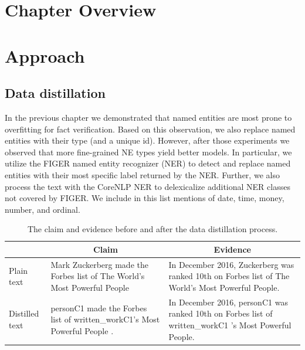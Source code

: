 \section{Chapter Overview}


\section{Approach}

\subsection{Data distillation}

In the previous chapter we demonstrated that named entities are most prone to overfitting for fact verification. Based on this observation, we also replace named entities with their type (and a unique id). However, after those experiments we observed that more fine-grained NE types yield better models. In particular, we utilize the FIGER  named entity recognizer (NER) \citep{ling2012fine} to detect and replace named entities with their most specific label returned by the NER. Further, we also process the text with the CoreNLP NER \citep{manning2014stanford} to delexicalize additional NER classes not covered by FIGER. We include in this list mentions of date, time, money, number, and ordinal.


\begin{table}[h]
\footnotesize
\begin{tabular}{p{10mm}p{26mm}p{30mm} }
\toprule
& \multicolumn{1}{c}{Claim} & \multicolumn{1}{c}{Evidence} \\
\midrule
\vspace{2mm}Plain text & \vspace{.1mm}Mark Zuckerberg made the Forbes list of The World's Most Powerful People  & In December 2016, Zuckerberg was ranked 10th on Forbes list of The World's Most Powerful People. \\
\midrule
\vspace{2mm}Distilled text & \vspace{.1mm}personC1 made the Forbes list of written\_workC1's Most Powerful People .   & In December 2016, personC1 was ranked 10th on Forbes list of written\_workC1 's Most Powerful People.  \\
\bottomrule
\end{tabular}
\caption{  The claim and evidence before and after the data distillation process.}
\label{distillation_examples}
\end{table}


